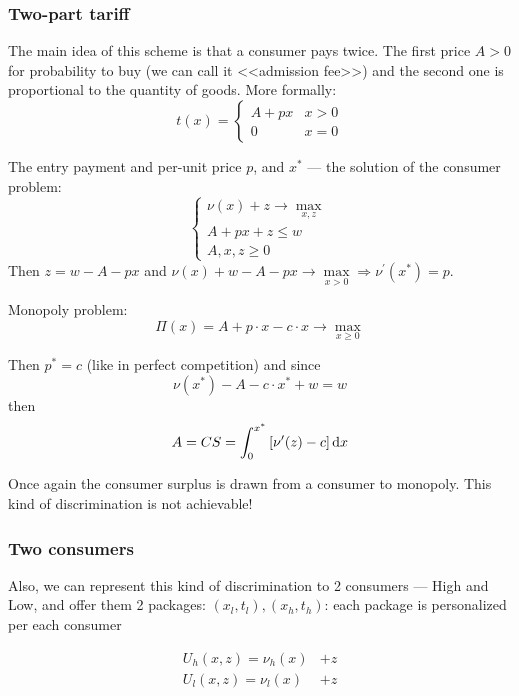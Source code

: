 \documentclass[a4paper, 10pt]{article}
\begin{document}
\subsubsection{Two-part tariff}
The main idea of this scheme is that a consumer pays twice. The first price $A>0$ for probability to buy (we can call it <<admission fee>>) and the second one is proportional to the quantity of goods. More formally:
\begin{equation*}
    t(x)=\begin{cases}
        A+px&x>0\\
        0&x=0
    \end{cases}
\end{equation*}

The entry payment and per-unit price $p$, and $x^*$ — the solution of the consumer problem:
\begin{equation*}
    \begin{cases}
        \nu(x)+z\longrightarrow\max\limits_{x,z}\\
        A+px+z\leqslant w\\
        A,x,z\geqslant 0
    \end{cases}
\end{equation*}
Then $z=w-A-px$ and $\nu(x)+w-A-p x \longrightarrow \max\limits_{x>0} \Longrightarrow \nu^{\prime}\left(x^*\right)=p$.

Monopoly problem:
$$
\Pi(x)=A+p \cdot x-c \cdot x \longrightarrow \max\limits_{x\geqslant 0}
$$

Then $p^*=c$ (like in perfect competition) and since 
$$\nu\left(x^*\right)-A-c \cdot x^*+w=w$$
then 
$$A=C S=\int_0^{x^*}\left[\nu^{\prime}(z)-c\right]\text{d}x$$

Once again the consumer surplus is drawn from a consumer to monopoly. This kind of discrimination is not achievable!


\subsubsection{Two consumers}
Also, we can represent this kind of discrimination to 2 consumers — High and Low, and offer them 2 packages: $(x_l,t_l), (x_h,t_h)$: each package is personalized per each consumer

$$
\begin{aligned}
    U_h(x, z)=\nu_h(x)&+z \\
    U_l(x, z)=\nu_l(x)&+z
\end{aligned}
$$
\end{document}
